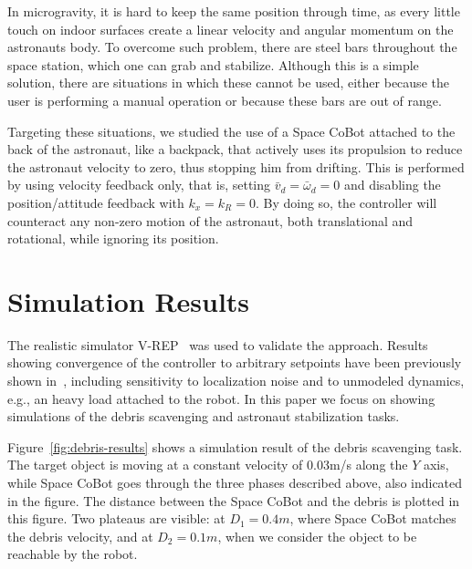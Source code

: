 \documentclass{article}
\begin{document}
In microgravity, it is hard to keep the same position through time, as every little touch 
on indoor surfaces create a linear velocity and angular momentum on the astronauts body.
To overcome such problem, there are steel bars throughout the space station, which one
can grab and stabilize. Although this is a simple solution, there are situations in which 
these cannot be used, either because the user is performing a manual operation or because
these bars are out of range. 

Targeting these situations, we studied the use of a Space CoBot
attached to the back of the astronaut, like a backpack, that actively
uses its propulsion to reduce the astronaut velocity to zero, thus
stopping him from drifting. This is performed by using velocity
feedback only, that is, setting $\bar{v}_d=\bar{\omega}_d=0$ and
disabling the position/attitude feedback with $k_x=k_R=0$. By doing
so, the controller will counteract any non-zero motion of the
astronaut, both translational and rotational, while ignoring its
position.






\section{Simulation Results}
\label{sec:sim-res}

The realistic simulator V-REP~\cite{vrep13} was used to validate the
approach. Results showing convergence of the controller to
arbitrary setpoints have been previously shown in~\cite{yoda:arxiv16a},
including sensitivity to localization noise and to unmodeled dynamics,
e.g., an heavy load attached to the robot. In this paper we focus on
showing simulations of the debris scavenging and astronaut
stabilization tasks.

Figure~\ref{fig:debris-results} shows a simulation result of the
debris scavenging task. The target object is moving at a constant velocity of
0.03m/s along the $Y$ axis, while Space CoBot goes through the three
phases described above, also indicated in the figure. The distance between
the Space CoBot and the debris is plotted in this figure. Two plateaus
are visible: at $D_1=0.4m$, where Space CoBot matches the debris velocity,
and at $D_2=0.1m$, when we consider the object to be reachable by the robot.
\end{document}
